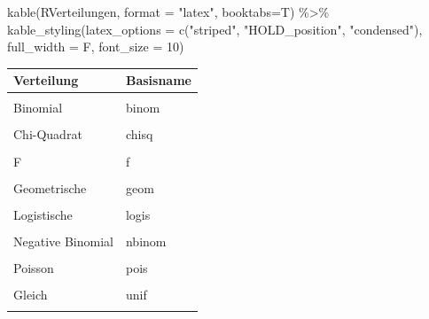 \documentclass[
  ngerman,
]{scrbook}
\newenvironment{Shaded}{\begin{snugshade}}{\end{snugshade}}
\newcommand{\AttributeTok}[1]{\textcolor[rgb]{0.77,0.63,0.00}{#1}}
\newcommand{\DecValTok}[1]{\textcolor[rgb]{0.00,0.00,0.81}{#1}}
\newcommand{\FunctionTok}[1]{\textcolor[rgb]{0.00,0.00,0.00}{#1}}
\newcommand{\NormalTok}[1]{#1}
\newcommand{\SpecialCharTok}[1]{\textcolor[rgb]{0.00,0.00,0.00}{#1}}
\newcommand{\StringTok}[1]{\textcolor[rgb]{0.31,0.60,0.02}{#1}}
\begin{document}
\begin{Shaded}
\begin{Highlighting}[]
\FunctionTok{kable}\NormalTok{(RVerteilungen, }\AttributeTok{format =} \StringTok{"latex"}\NormalTok{, }\AttributeTok{booktabs=}\NormalTok{T) }\SpecialCharTok{\%\textgreater{}\%} 
  \FunctionTok{kable\_styling}\NormalTok{(}\AttributeTok{latex\_options =} \FunctionTok{c}\NormalTok{(}\StringTok{"striped"}\NormalTok{, }\StringTok{"HOLD\_position"}\NormalTok{, }\StringTok{"condensed"}\NormalTok{),}
                \AttributeTok{full\_width    =}\NormalTok{ F, }
                \AttributeTok{font\_size     =} \DecValTok{10}\NormalTok{)}
\end{Highlighting}
\end{Shaded}

\begin{table}[H]
\centering\begingroup\fontsize{10}{12}\selectfont

\begin{tabular}{ll}
\toprule
Verteilung & Basisname\\
\midrule
\cellcolor{gray!6}{Beta} & \cellcolor{gray!6}{beta}\\
Binomial & binom\\
\cellcolor{gray!6}{Cauchy} & \cellcolor{gray!6}{cauchy}\\
Chi-Quadrat & chisq\\
\cellcolor{gray!6}{Exponential} & \cellcolor{gray!6}{exp}\\
\addlinespace
F & f\\
\cellcolor{gray!6}{Gamma} & \cellcolor{gray!6}{gamma}\\
Geometrische & geom\\
\cellcolor{gray!6}{Hypergeometrische} & \cellcolor{gray!6}{hyper}\\
Logistische & logis\\
\addlinespace
\cellcolor{gray!6}{Lognormal} & \cellcolor{gray!6}{lnorm}\\
Negative Binomial & nbinom\\
\cellcolor{gray!6}{Normal} & \cellcolor{gray!6}{norm}\\
Poisson & pois\\
\cellcolor{gray!6}{Students t} & \cellcolor{gray!6}{t}\\
\addlinespace
Gleich & unif\\
\cellcolor{gray!6}{Weibull} & \cellcolor{gray!6}{weibull}\\
\bottomrule
\end{tabular}
\endgroup{}
\end{table}
\end{document}
